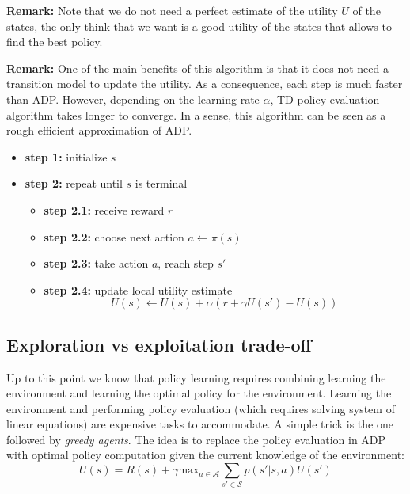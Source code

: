 \textbf{Remark:} Note that we do not need a perfect estimate of the utility $U$ of the states, the only think that we want is a good utility of the states that allows to find the best policy. \newline

\textbf{Remark:} One of the main benefits of this algorithm is that it does not need a transition model to update the utility. As a consequence, each step is much faster than ADP. However, depending on the learning rate $\alpha$, TD policy evaluation algorithm takes longer to converge. In a sense, this algorithm can be seen as a rough efficient approximation of ADP. \newline

\begin{itemize}
    \item \textbf{step 1:} initialize $s$
    \item \textbf{step 2:} repeat until $s$ is terminal
    \begin{itemize}
        \item \textbf{step 2.1:} receive reward $r$
        \item \textbf{step 2.2:} choose next action $a \leftarrow \pi(s)$
        \item \textbf{step 2.3:} take action $a$, reach step $s'$
        \item \textbf{step 2.4:} update local utility estimate
        $$U(s) \leftarrow U(s) + \alpha(r+\gamma U(s') - U(s))$$
    \end{itemize}
\end{itemize}

\subsection{Exploration vs exploitation trade-off}
Up to this point we know that policy learning requires combining learning the environment and learning the optimal policy for the environment. Learning the environment and performing policy evaluation (which requires solving system of linear equations) are expensive tasks to accommodate. A simple trick is the one followed by \textit{greedy agents}. The idea is to replace the policy evaluation in ADP with optimal policy computation given the current knowledge of the environment:
\begin{equation}
    U(s) = R(s) + \gamma \text{max}_{a \in \mathcal{A}} \sum_{s' \in \mathcal{S}} p(s' |s,a)U(s')
\end{equation}

